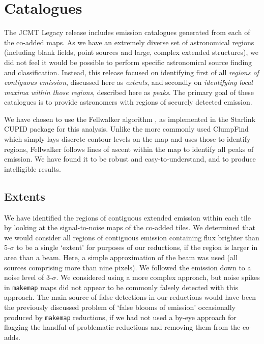 \documentclass[twocolumn,times]{aastex6}
\begin{document}
\section{Catalogues}
\label{sec:cat}
The JCMT Legacy release includes emission catalogues generated from
each of the co-added maps. As we have an extremely diverse set of
astronomical regions (including blank fields, point sources and large,
complex extended structures), we did not feel it would be possible to
perform specific astronomical source finding and
classification. Instead, this release focused on identifying first of
all \emph{regions of contiguous emission}, discussed here as
\emph{extents}, and secondly on \emph{identifying local maxima within
  those regions}, described here as \emph{peaks}. The primary goal of
these catalogues is to provide astronomers with regions of securely
detected emission.


We have chosen to use the Fellwalker algorithm \citep{Berry2015}, as
implemented in the Starlink CUPID \citep{cupid} package for this
analysis. Unlike the more commonly used ClumpFind which simply lays
discrete contour levels on the map and uses those to identify regions,
Fellwalker follows lines of ascent within the map to identify all
peaks of emission. We have found it to be robust and
easy-to-understand, and to produce intelligible results.

\subsection{Extents}
\label{sec:extents}
We have identified the regions of contiguous extended emission within
each tile by looking at the signal-to-noise maps of the co-added
tiles. We determined that we would consider all regions of contiguous
emission containing flux brighter than 5-$\sigma$ to be a single `extent'
for purposes of our reductions, if the region is larger in area than a
beam.  Here, a simple approximation of the beam was used (all sources
comprising more than nine pixels). We followed the emission down to a noise level
of 3-$\sigma$. We considered using a more complex approach, but noise
spikes in \texttt{makemap} maps did not appear to be commonly falsely detected
with this approach. The main source of false detections in our
reductions would have been the previously discussed problem of `false
blooms of emission' occasionally produced by \texttt{makemap} reductions, if we
had not used a by-eye approach for flagging the handful of problematic
reductions and removing them from the co-adds.
\end{document}
